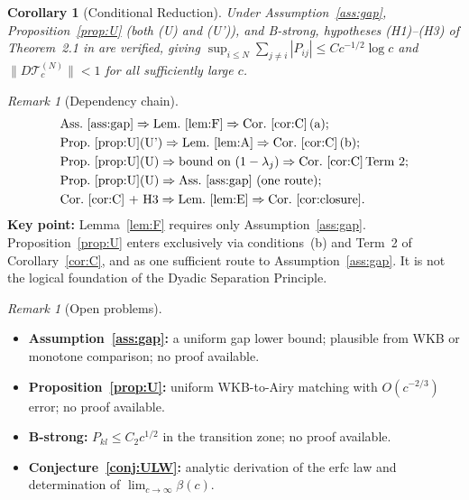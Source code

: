 \documentclass[12pt]{amsart}
\newtheorem{corollary}[theorem]{Corollary}
\theoremstyle{definition}
\theoremstyle{remark}
\newtheorem{remark}[theorem]{Remark}
\newcommand{\norm}[1]{\lVert#1\rVert}
\begin{document}
\begin{corollary}[Conditional Reduction]
\label{cor:closure}
Under Assumption~\ref{ass:gap},
Proposition~\ref{prop:U} (both \textup{(U)} and
\textup{(U')}), and B-strong,
hypotheses (H1)--(H3) of Theorem~2.1 in \cite{paperVII}
are verified, giving
$\sup_{i\le N}\sum_{j\ne i}|P_{ij}|
\le Cc^{-1/2}\log c$
and $\norm{D\mathcal{T}_c^{(N)}} < 1$
for all sufficiently large $c$.
\end{corollary}

\begin{remark}[Dependency chain]
\label{rem:deps}
\begin{align*}
  &\text{Ass.~\ref{ass:gap}}
    \Rightarrow\text{Lem.~\ref{lem:F}}
    \Rightarrow\text{Cor.~\ref{cor:C}\,(a)};\\
  &\text{Prop.~\ref{prop:U}(U')}
    \Rightarrow\text{Lem.~\ref{lem:A}}
    \Rightarrow\text{Cor.~\ref{cor:C}\,(b)};\\
  &\text{Prop.~\ref{prop:U}(U)}
    \Rightarrow\text{bound on }(1-\lambda_j)
    \Rightarrow\text{Cor.~\ref{cor:C}\,Term 2};\\
  &\text{Prop.~\ref{prop:U}(U)}
    \Rightarrow\text{Ass.~\ref{ass:gap} (one route)};\\
  &\text{Cor.~\ref{cor:C} + H3}
    \Rightarrow\text{Lem.~\ref{lem:E}}
    \Rightarrow\text{Cor.~\ref{cor:closure}}.
\end{align*}
\textbf{Key point:}
Lemma~\ref{lem:F} requires only Assumption~\ref{ass:gap}.
Proposition~\ref{prop:U} enters exclusively via
conditions~(b) and Term~2 of Corollary~\ref{cor:C},
and as one sufficient route to Assumption~\ref{ass:gap}.
It is not the logical foundation of the
Dyadic Separation Principle.
\end{remark}

\begin{remark}[Open problems]
\label{rem:open}
\begin{itemize}
\item \textbf{Assumption~\ref{ass:gap}:}
  a uniform gap lower bound; plausible from WKB
  or monotone comparison; no proof available.
\item \textbf{Proposition~\ref{prop:U}:}
  uniform WKB-to-Airy matching with
  $O(c^{-2/3})$ error; no proof available.
\item \textbf{B-strong:}
  $P_{kl}\le C_2 c^{1/2}$ in the transition zone;
  no proof available.
\item \textbf{Conjecture~\ref{conj:ULW}:}
  analytic derivation of the erfc law and
  determination of $\lim_{c\to\infty}\beta(c)$.
\end{itemize}
\end{remark}
\end{document}
